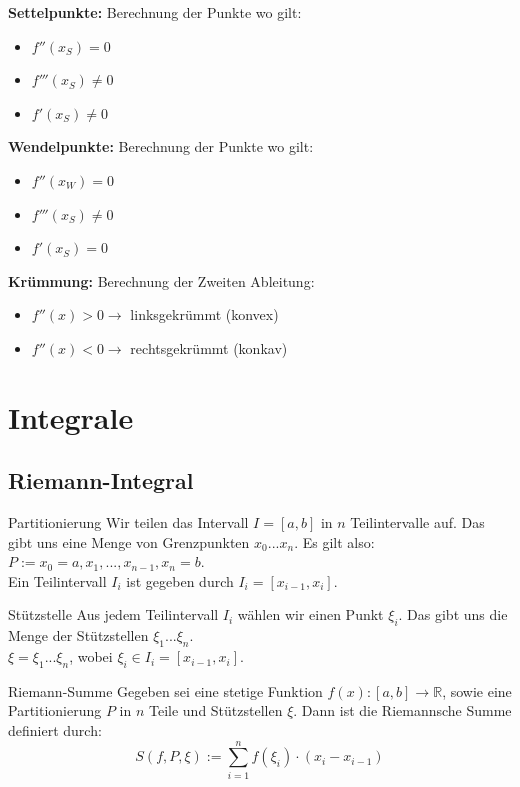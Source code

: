 \documentclass[a4paper,8pt]{extarticle}
\def\R{\mathbb{R}}
\begin{document}
\textbf{Settelpunkte:} Berechnung der Punkte wo gilt:
\begin{itemize}
  \item $f''(x_S) = 0$
  \item $f'''(x_S) \neq 0$
  \item $f'(x_S) \neq 0$
\end{itemize}

\textbf{Wendelpunkte:} Berechnung der Punkte wo gilt:
\begin{itemize}
  \item $f''(x_W) = 0$
  \item $f'''(x_S) \neq 0$
  \item $f'(x_S) = 0$
\end{itemize}

\textbf{Krümmung:} Berechnung der Zweiten Ableitung:
\begin{itemize}
  \item $f''(x) > 0 \rightarrow$ linksgekrümmt (konvex)
  \item $f''(x) < 0 \rightarrow$ rechtsgekrümmt (konkav)
\end{itemize}

\section{Integrale}
\subsection{Riemann-Integral}
\begin{subbox}{Partitionierung}
  Wir teilen das Intervall $I = [a, b]$ in $n$ Teilintervalle auf. Das gibt uns eine Menge von Grenzpunkten $x_0...x_n$. Es gilt also:
  $P := {x_0 = a, x_1, ..., x_{n-1}, x_n = b}$.\\
  Ein Teilintervall $I_i$ ist gegeben durch $I_i =
  [x_{i-1}, x_i]$.
\end{subbox}
\begin{subbox}{Stützstelle}
  Aus jedem Teilintervall $I_i$ wählen wir einen Punkt $\xi_i$. Das gibt uns die Menge der Stützstellen $\xi_1...\xi_n$. \\ $\xi = {\xi_1...\xi_n}$, wobei $\xi_i \in I_i = [x_{i-1}, x_i]$.
\end{subbox}
\begin{mainbox}{Riemann-Summe}
  Gegeben sei eine stetige Funktion $f(x) : [a, b] \rightarrow \R$, sowie eine Partitionierung $P$ in $n$ Teile und Stützstellen $\xi$. Dann ist die Riemannsche Summe definiert durch:
 $$S(f, P, \xi) := \sum_{i=1}^n f(\xi_i) \cdot (x_i - x_{i-1})$$
\end{mainbox}
\end{document}
